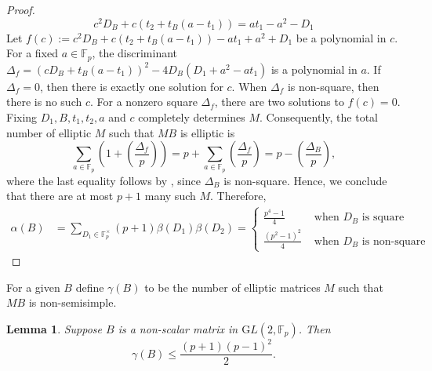 \documentclass[12pt,reqno]{amsart}
\theoremstyle{plain}
\newtheorem{lemma}[thm]{Lemma}
\theoremstyle{definition}
\newcommand{\GL}{{\mathrm GL}}
\theoremstyle{remark}
\newcommand{\FF}{\mathbb{F}}
\begin{document}
\begin{proof}
    $$c^2D_B + c(t_2+t_B(a-t_1))=at_1-a^2-D_1$$ 
    Let $f(c):=c^2D_B + c(t_2+t_B(a-t_1))-at_1+a^2+D_1$ be a polynomial in $c.$ For a fixed $a \in \FF_p$, the discriminant $\Delta_f=(cD_B+t_B(a-t_1))^2-4D_B(D_1+a^2-at_1)$ is a polynomial in $a$. If $\Delta_f=0$, then there is exactly one solution for $c.$ When $\Delta_f$ is non-square, then there is no such $c$. For a nonzero square $\Delta_f$, there are two solutions to $f(c)=0.$ Fixing $D_1, B, t_1, t_2, a$ and $c$ completely determines $M$. Consequently, the total number of elliptic $M$ such that $MB$ is elliptic is $$\sum_{a\in \FF_p} \left(1+ \left(\frac{\Delta_f}{p}\right)\right)= p+\sum_{a\in \FF_p}   \left(\frac{\Delta_f}{p}\right) = p- \left(\frac{\Delta_B}{p}\right) ,$$
    where the last equality follows by , since $\Delta_B$ is non-square. Hence, we conclude that there are at most $p+1$ many such $M$. Therefore,
        \begin{align*}
        \alpha(B) &=  \sum_{D_1\in \FF_p^{\times}} (p+1)\beta(D_1)\beta(D_2)=\begin{cases}
             \frac{p^4-1}{4} & \text{~when~}D_B \text{~is square}\\
            \frac{(p^2-1)^2}{4} & \text{~when~} D_B \text{~is non-square}
        \end{cases}  
    \end{align*}
\end{proof}
For a given $B$ define $\gamma(B)$ to be the number of elliptic matrices $M$ such that $MB$ is non-semisimple.
\begin{lemma}\label{lem: nonsplit ss M goes to non-semisimple MB}
   Suppose $B$ is a non-scalar matrix in $\GL(2, \FF_p)$. Then $$\gamma(B)\leq \frac{(p+1)(p-1)^2}{2} .$$  
\end{lemma}
\end{document}
